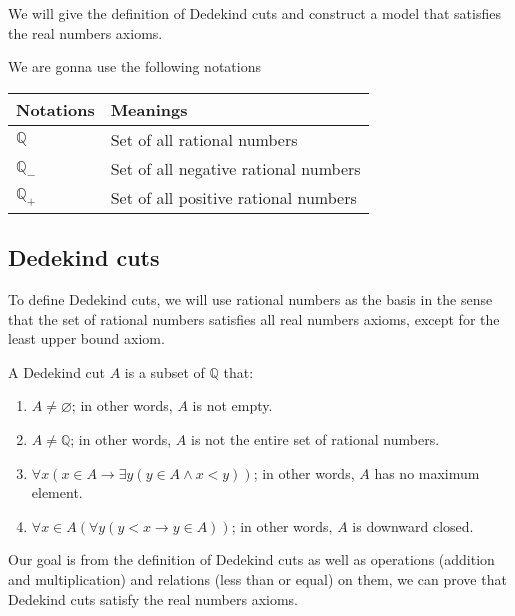 \par We will give the definition of Dedekind cuts and construct a model that satisfies the real numbers axioms.

\par We are gonna use the following notations
\begin{table}[htp]
    \centering
    \begin{tabular}{ll}
        Notations & Meanings \\
        \bottomrule
        \toprule
        $\mathbb{Q}$ & Set of all rational numbers \\
        $\mathbb{Q}_{-}$ & Set of all negative rational numbers \\
        $\mathbb{Q}_{+}$ & Set of all positive rational numbers
    \end{tabular}
\end{table}

\subsection*{Dedekind cuts}

\par To define Dedekind cuts, we will use rational numbers as the basis in the sense that the set of rational numbers satisfies all real numbers axioms, except for the least upper bound axiom.

\begin{definition}
    A Dedekind cut $A$ is a subset of $\mathbb{Q}$ that:
    \begin{enumerate}[label = (DC\arabic*)]
        \item $A\ne\varnothing$; in other words, $A$ is not empty.
        \item $A\neq\mathbb{Q}$; in other words, $A$ is not the entire set of rational numbers.
        \item $\forall x\left(x\in A \rightarrow \exists y \left( y\in A \wedge x < y \right)\right)$; in other words, $A$ has no maximum element.
        \item $\forall x\in A\left(\forall y( y < x \rightarrow y\in A)\right)$; in other words, $A$ is downward closed.
    \end{enumerate}
\end{definition}

\par Our goal is from the definition of Dedekind cuts as well as operations (addition and multiplication) and relations (less than or equal) on them, we can prove that Dedekind cuts satisfy the real numbers axioms.

